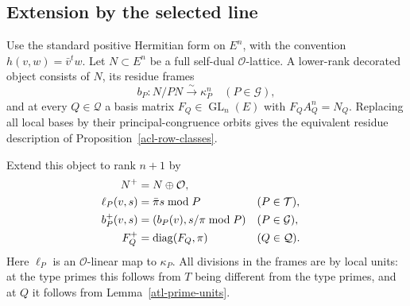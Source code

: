 \subsection{Extension by the selected line}

Use the standard positive Hermitian form on $E^n$, with
the convention $h(v,w)=\bar v^{t}w$.  Let $N\subset E^n$
be a full self-dual $\mathcal O$-lattice.  A lower-rank
decorated object consists of $N$, its residue frames
\[
 b_P:N/PN\xrightarrow{\sim}\kappa_P^n
                       \quad(P\in\mathcal G),
\]
and at every $Q\in\mathcal Q$ a basis matrix
$F_Q\in\operatorname{GL}_n(E)$ with
$F_QA_Q^n=N_Q$.  Replacing all local bases by their
principal-congruence orbits gives the equivalent residue
description of Proposition~\ref{acl-row-classes}.

Extend this object to rank $n+1$ by
\begin{align}
 N^+&=N\oplus\mathcal O,\notag\\
 \ell_P(v,s)&=\bar\pi s\bmod P
                    &&(P\in\mathcal T),\label{atl-extended-object}\\
 b_P^+(v,s)&=(b_P(v),s/\pi\bmod P)
                    &&(P\in\mathcal G),\notag\\
 F_Q^+&=\operatorname{diag}(F_Q,\pi)
                    &&(Q\in\mathcal Q).\notag
\end{align}
Here $\ell_P$ is an $\mathcal O$-linear map to $\kappa_P$.
All divisions in the frames are by local units: at the
type primes this follows from $T$ being different from
the type primes, and at $Q$ it follows from
Lemma~\ref{atl-prime-units}.

